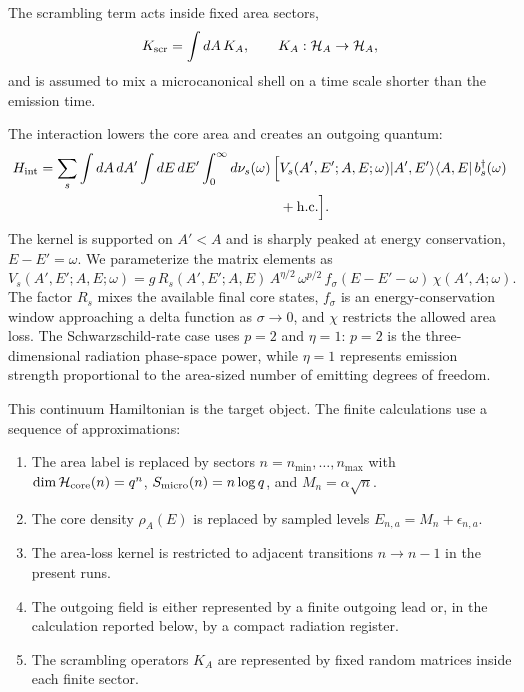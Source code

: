 \documentclass[12pt]{article}
\newcommand{\Hcore}{\mathcal H_{\rm core}}
\newcommand{\Smicro}{S_{\rm micro}}
\newcommand{\ket}[1]{|#1\rangle}
\newcommand{\bra}[1]{\langle #1|}
\begin{document}
The scrambling term acts inside fixed area sectors,
\begin{equation}
    K_{\rm scr}=\int dA\,K_A,\qquad K_A:\mathcal H_A\to\mathcal H_A ,
\end{equation}
and is assumed to mix a microcanonical shell on a time scale shorter than the
emission time.

The interaction lowers the core area and creates an outgoing quantum:
\begin{align}
    H_{\rm int}
    =
    \sum_s
    \int dA\,dA'\int dE\,dE'
    \int_0^\infty d\nu_s(\omega)\,
    \Big[
    &V_s(A',E';A,E;\omega)
    \ket{A',E'}\bra{A,E}\,
    b_s^\dagger(\omega)
    \nonumber\\
    &+{\rm h.c.}\Big] .
\end{align}
The kernel is supported on $A'<A$ and is sharply peaked at energy conservation,
$E-E'=\omega$.  We parameterize the matrix elements as
\begin{equation}
    V_s(A',E';A,E;\omega)
    =
    g\,R_s(A',E';A,E)\,
    A^{\eta/2}\,
    \omega^{p/2}\,
    f_\sigma(E-E'-\omega)\,
    \chi(A',A;\omega).
\end{equation}
The factor $R_s$ mixes the available final core states, $f_\sigma$ is an
energy-conservation window approaching a delta function as $\sigma\to0$, and
$\chi$ restricts the allowed area loss.  The Schwarzschild-rate case uses
$p=2$ and $\eta=1$: $p=2$ is the three-dimensional radiation phase-space
power, while $\eta=1$ represents emission strength proportional to the
area-sized number of emitting degrees of freedom.

This continuum Hamiltonian is the target object.  The finite calculations use
a sequence of approximations:
\begin{enumerate}
    \item The area label is replaced by sectors $n=n_{\min},\ldots,n_{\max}$
    with $\dim\Hcore(n)=q^n$, $\Smicro(n)=n\log q$, and
    $M_n=\alpha\sqrt n$.
    \item The core density $\rho_A(E)$ is replaced by sampled levels
    $E_{n,a}=M_n+\epsilon_{n,a}$.
    \item The area-loss kernel is restricted to adjacent transitions
    $n\to n-1$ in the present runs.
    \item The outgoing field is either represented by a finite outgoing lead or,
    in the calculation reported below, by a compact radiation register.
    \item The scrambling operators $K_A$ are represented by fixed random
    matrices inside each finite sector.
\end{enumerate}
\end{document}
